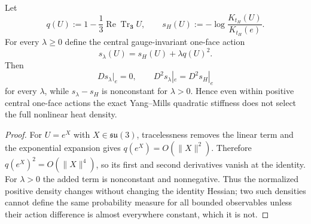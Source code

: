 \documentclass[12pt,a4paper]{article}
\begin{document}
\begin{corollary}
\label{p10:cor:v2159-same-hessian-nonheat-family}
Let
\[
 q(U):=1-\frac13\operatorname{Re}\operatorname{Tr}_{\mathbf3}U,
 \qquad
 s_H(U):=-\log\frac{K_{t_H}(U)}{K_{t_H}(e)}.
\]
For every $\lambda\ge0$ define the central gauge-invariant one-face action
\[
 \boxed{s_\lambda(U)=s_H(U)+\lambda q(U)^2.}
\]
Then
\[
 Ds_\lambda|_e=0,
 \qquad
 \boxed{D^2s_\lambda|_e=D^2s_H|_e}
\]
for every $\lambda$, while $s_\lambda-s_H$ is nonconstant for
$\lambda>0$.  Hence even within positive central one-face actions the exact
Yang--Mills quadratic stiffness does not select the full nonlinear heat
density.
\end{corollary}
\begin{proof}
For $U=e^X$ with $X\in\mathfrak{su}(3)$, tracelessness removes the linear
term and the exponential expansion gives
$ q(e^X)=O(\|X\|^2)$.  Therefore $q(e^X)^2=O(\|X\|^4)$, so its first and
second derivatives vanish at the identity.  For $\lambda>0$ the added term
is nonconstant and nonnegative.  Thus the normalized positive density changes
without changing the identity Hessian; two such densities cannot define the
same probability measure for all bounded observables unless their action
difference is almost everywhere constant, which it is not.
\end{proof}
\end{document}
